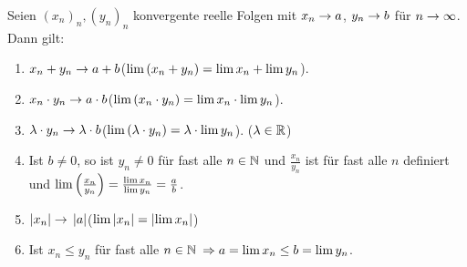 \begin{satz}
    \label{satz:konvergenzsaetze}
    Seien $(x_n)_n, (y_n)_n$ konvergente reelle Folgen mit $x_n\rightarrow{} a$, $y_n\rightarrow{} b$ für $n\rightarrow{}\infty$. Dann gilt:
    \begin{enumerate}[label=(\alph*)]
        \item $x_n+y_n\rightarrow{} a+b$\quad ($\lim\left(x_n+y_n\right)=\lim x_n + \lim y_n$).
        \item $x_n\cdot y_n \rightarrow{} a\cdot b$\quad ($\lim\left(x_n\cdot y_n\right) = \lim x_n \cdot \lim y_n$).
        \item $\lambda\cdot y_n \rightarrow{} \lambda\cdot b$\quad ($\lim\left(\lambda\cdot y_n\right) = \lambda \cdot \lim y_n$). ($\lambda\in\mathbb{R}$)
        \item Ist $b\neq 0$, so ist $y_n \neq 0$ für fast alle $n\in\mathbb{N}$ und $\frac{x_n}{y_n}$ ist für fast alle $n$ definiert und $\lim\left(\frac{x_n}{y_n}\right) = \frac{\lim x_n}{\lim y_n} = \frac{a}{b}$.
        \item $\left|x_n\right| \rightarrow{} \left|a\right|$\quad ($\lim \left|x_n\right| = \left|\lim x_n\right|$)
        \item Ist $x_n \leq y_n$ für fast alle $n\in\mathbb{N}$ $\Rightarrow{} a = \lim x_n \leq b = \lim y_n$.
    \end{enumerate}


\end{satz}
